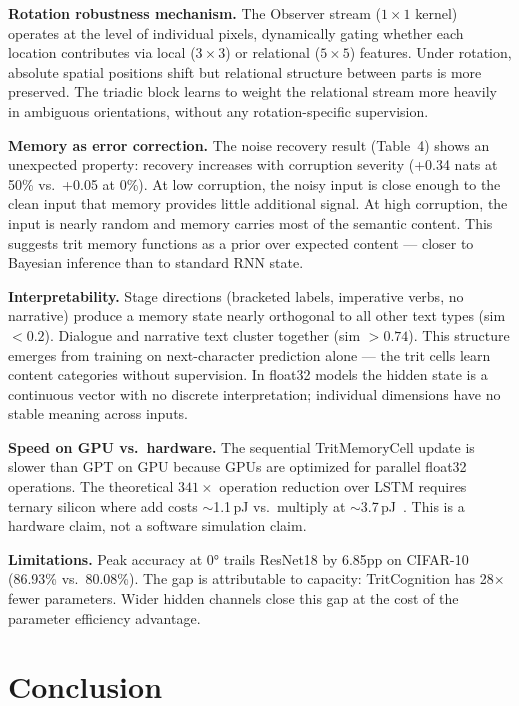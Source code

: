\documentclass[10pt,twocolumn]{article}
\newcommand{\tritnet}{TritCognition}
\begin{document}
\textbf{Rotation robustness mechanism.}
The Observer stream ($1\times1$ kernel) operates at the level of individual
pixels, dynamically gating whether each location contributes via local
($3\times3$) or relational ($5\times5$) features. Under rotation, absolute
spatial positions shift but relational structure between parts is more
preserved. The triadic block learns to weight the relational stream more
heavily in ambiguous orientations, without any rotation-specific supervision.

\textbf{Memory as error correction.}
The noise recovery result (Table~4) shows an unexpected property: recovery
increases with corruption severity (+0.34 nats at 50\% vs.\ +0.05 at 0\%).
At low corruption, the noisy input is close enough to the clean input that
memory provides little additional signal. At high corruption, the input is
nearly random and memory carries most of the semantic content. This suggests
trit memory functions as a prior over expected content --- closer to Bayesian
inference than to standard RNN state.

\textbf{Interpretability.}
Stage directions (bracketed labels, imperative verbs, no narrative) produce
a memory state nearly orthogonal to all other text types
(sim $< 0.2$). Dialogue and narrative text cluster together (sim $> 0.74$).
This structure emerges from training on next-character prediction alone ---
the trit cells learn content categories without supervision. In float32
models the hidden state is a continuous vector with no discrete
interpretation; individual dimensions have no stable meaning across inputs.

\textbf{Speed on GPU vs.\ hardware.}
The sequential TritMemoryCell update is slower than GPT on GPU because
GPUs are optimized for parallel float32 operations. The theoretical
$341\times$ operation reduction over LSTM requires ternary silicon where
add costs ${\sim}$1.1\,pJ vs.\ multiply at ${\sim}$3.7\,pJ~\cite{andri2018}.
This is a hardware claim, not a software simulation claim.

\textbf{Limitations.}
Peak accuracy at 0° trails ResNet18 by 6.85pp on CIFAR-10 (86.93\% vs.\
80.08\%). The gap is attributable to capacity: \tritnet{} has 28$\times$
fewer parameters. Wider hidden channels close this gap at the cost of
the parameter efficiency advantage.

\section{Conclusion}
\end{document}
